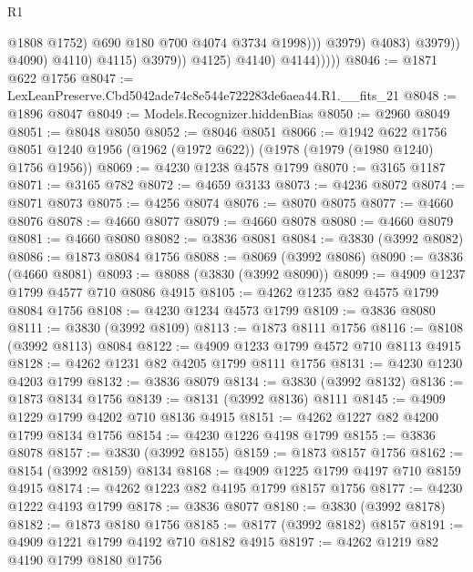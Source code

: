 \begin{lexlean}{R1}
\begin{coremodule}
                                            @1808
                                            @1752)
                                          @690
                                          @180
                                          @700
                                          @4074
                                          @3734
                                          @1998)))
                                    @3979)
                                  @4083)
                                @3979))
                            @4090)
                          @4110)
                        @4115)
                      @3979))
                  @4125)
                @4140)
              @4144)))))
@8046 := @1871 @622 @1756
@8047 := LexLeanPreserve.Cbd5042ade74c8e544e722283de6aea44.R1.__fits_21
@8048 := @1896 @8047
@8049 := Models.Recognizer.hiddenBias
@8050 := @2960 @8049
@8051 := @8048 @8050
@8052 := @8046 @8051
@8066 := @1942
    @622
    @1756
    @8051
    @1240
    @1956
    (@1962 (@1972 @622))
    (@1978 (@1979 (@1980 @1240) @1756 @1956))
@8069 := @4230 @1238 @4578 @1799
@8070 := @3165 @1187
@8071 := @3165 @782
@8072 := @4659 @3133
@8073 := @4236 @8072
@8074 := @8071 @8073
@8075 := @4256 @8074
@8076 := @8070 @8075
@8077 := @4660 @8076
@8078 := @4660 @8077
@8079 := @4660 @8078
@8080 := @4660 @8079
@8081 := @4660 @8080
@8082 := @3836 @8081
@8084 := @3830 (@3992 @8082)
@8086 := @1873 @8084 @1756
@8088 := @8069 (@3992 @8086)
@8090 := @3836 (@4660 @8081)
@8093 := @8088 (@3830 (@3992 @8090))
@8099 := @4909 @1237 @1799 @4577 @710 @8086 @4915
@8105 := @4262 @1235 @82 @4575 @1799 @8084 @1756
@8108 := @4230 @1234 @4573 @1799
@8109 := @3836 @8080
@8111 := @3830 (@3992 @8109)
@8113 := @1873 @8111 @1756
@8116 := @8108 (@3992 @8113) @8084
@8122 := @4909 @1233 @1799 @4572 @710 @8113 @4915
@8128 := @4262 @1231 @82 @4205 @1799 @8111 @1756
@8131 := @4230 @1230 @4203 @1799
@8132 := @3836 @8079
@8134 := @3830 (@3992 @8132)
@8136 := @1873 @8134 @1756
@8139 := @8131 (@3992 @8136) @8111
@8145 := @4909 @1229 @1799 @4202 @710 @8136 @4915
@8151 := @4262 @1227 @82 @4200 @1799 @8134 @1756
@8154 := @4230 @1226 @4198 @1799
@8155 := @3836 @8078
@8157 := @3830 (@3992 @8155)
@8159 := @1873 @8157 @1756
@8162 := @8154 (@3992 @8159) @8134
@8168 := @4909 @1225 @1799 @4197 @710 @8159 @4915
@8174 := @4262 @1223 @82 @4195 @1799 @8157 @1756
@8177 := @4230 @1222 @4193 @1799
@8178 := @3836 @8077
@8180 := @3830 (@3992 @8178)
@8182 := @1873 @8180 @1756
@8185 := @8177 (@3992 @8182) @8157
@8191 := @4909 @1221 @1799 @4192 @710 @8182 @4915
@8197 := @4262 @1219 @82 @4190 @1799 @8180 @1756

\end{coremodule}
\end{lexlean}

